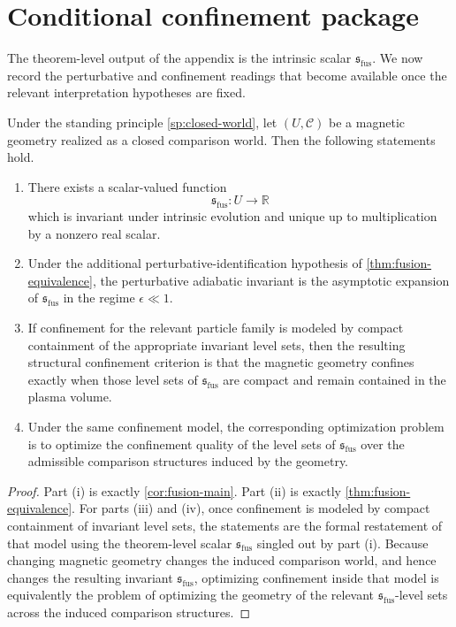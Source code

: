 \section{Conditional confinement package}
\label{sec:fusion-prediction}
The theorem-level output of the appendix is the intrinsic scalar \(\mathfrak s_{\mathrm{fus}}\).
We now record the perturbative and confinement readings that become
available once the relevant interpretation hypotheses are fixed.
\begin{theorem}
	\label{thm:fusion-prediction}
	Under the standing principle \cref{sp:closed-world}, let
	\((U,\mathcal C)\) be a magnetic geometry realized as a closed
	comparison world.
	Then the following statements hold.
	\begin{enumerate}[label=\textup{(\roman*)}]
		\item
		      There exists a scalar-valued function
		      \[
			      \mathfrak s_{\mathrm{fus}}:U\to\mathbb R
		      \]
		      which is invariant under intrinsic evolution and unique up to
		      multiplication by a nonzero real scalar.
		\item
		      Under the additional perturbative-identification hypothesis of
		      \cref{thm:fusion-equivalence}, the perturbative adiabatic invariant is the
		      asymptotic expansion of \(\mathfrak s_{\mathrm{fus}}\) in the regime \(\epsilon\ll 1\).
		\item
		      If confinement for the relevant particle family is modeled by compact
		      containment of the appropriate invariant level sets, then the resulting
		      structural confinement criterion is that the magnetic geometry confines
		      exactly when those level sets of \(\mathfrak s_{\mathrm{fus}}\) are compact and remain contained in
		      the plasma volume.
		\item
		      Under the same confinement model, the corresponding optimization problem is
		      to optimize the confinement quality of the level sets of \(\mathfrak s_{\mathrm{fus}}\) over the
		      admissible comparison structures induced by the geometry.
	\end{enumerate}
\end{theorem}
\begin{proof}
	Part \textup{(i)} is exactly \cref{cor:fusion-main}.
	Part \textup{(ii)} is exactly \cref{thm:fusion-equivalence}.
	For parts \textup{(iii)} and \textup{(iv)}, once confinement is modeled by compact
	containment of invariant level sets, the statements are the formal
	restatement of that model using the theorem-level scalar \(\mathfrak s_{\mathrm{fus}}\) singled
	out by part \textup{(i)}.
	Because changing magnetic geometry changes the induced comparison world,
	and hence changes the resulting invariant \(\mathfrak s_{\mathrm{fus}}\), optimizing confinement
	inside that model is equivalently the problem of optimizing the geometry
	of the relevant \(\mathfrak s_{\mathrm{fus}}\)-level sets across the induced comparison
	structures.
\end{proof}
